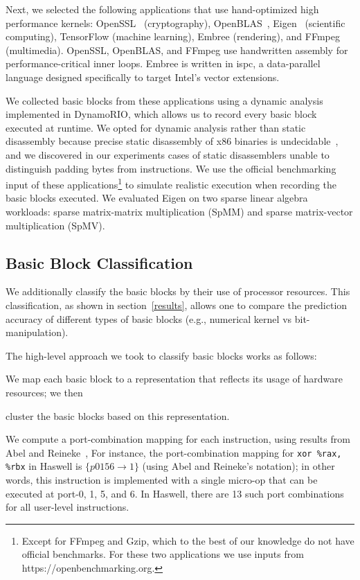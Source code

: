 Next, we selected the following applications that use hand-optimized high performance kernels:
OpenSSL~\cite{openssl} (cryptography), OpenBLAS~\cite{openblas}, Eigen~\cite{eigen} (scientific computing),
TensorFlow\cite{tensorflow} (machine learning),
Embree\cite{embree} (rendering), and FFmpeg (multimedia).
OpenSSL, OpenBLAS, and FFmpeg use handwritten assembly for performance-critical inner loops.
Embree is written in ispc\cite{ispc}, a data-parallel language
designed specifically to target Intel's vector extensions.

We collected basic blocks from these applications using
a dynamic analysis implemented in DynamoRIO\cite{dynamorio},
which allows us to record every basic block
executed at runtime.
We opted for dynamic analysis rather than static disassembly
because precise static disassembly of x86 binaries
is undecidable~\cite{disassembly-undecidable},
and we discovered in our experiments cases of
static disassemblers unable to distinguish padding bytes from instructions.
We use the official benchmarking input of these applications\footnote{
Except for FFmpeg and Gzip, which to the best of our knowledge do not have
official benchmarks. For these two applications we use inputs
from https://openbenchmarking.org.
} to simulate realistic execution when recording the basic blocks executed.
We evaluated Eigen on two sparse linear algebra workloads:
sparse matrix-matrix multiplication (SpMM) and 
sparse matrix-vector multiplication (SpMV).

\subsection{Basic Block Classification}\label{classification}
We additionally classify the basic blocks by their use of processor resources.
This classification, as shown in section~\ref{results},
allows one to compare the prediction accuracy of different types of basic blocks 
(e.g., numerical kernel vs bit-manipulation).

The high-level approach we took to classify basic blocks works as follows:
\begin{enumerate*}
\item We map each basic block to a representation
that reflects its usage of hardware resources; we then
\item cluster the basic blocks based on this representation.
\end{enumerate*}

We compute a port-combination mapping for each instruction,
using results from Abel and Reineke~\cite{uops},
For instance,
the port-combination mapping for \verb|xor %rax, %rbx| in Haswell
is $\{ p0156 \rightarrow 1 \}$ (using Abel and Reineke's notation);
in other words, this instruction is implemented 
with a single micro-op that can be executed at port-0, 1, 5, and 6.
In Haswell, there are 13 such port combinations for all user-level instructions.

